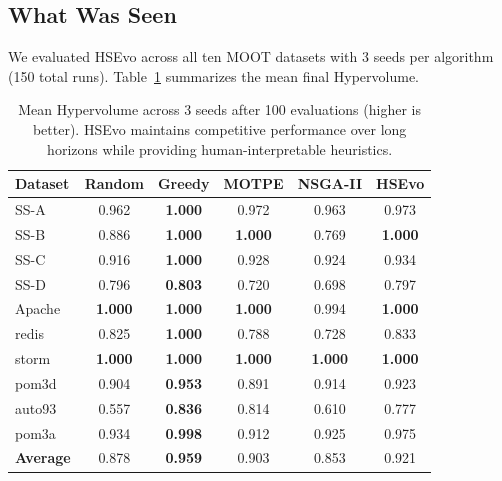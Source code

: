 \documentclass[sigconf,nonacm]{acmart}
\begin{document}
\subsection{What Was Seen}
We evaluated HSEvo across all ten MOOT datasets with 3 seeds per algorithm (150 total runs). Table~\ref{tab:moot-results} summarizes the mean final Hypervolume.

\begin{table}[h]
\caption{Mean Hypervolume across 3 seeds after 100 evaluations (higher is better). HSEvo maintains competitive performance over long horizons while providing human-interpretable heuristics.}
\label{tab:moot-results}
\begin{tabular}{lccccc}
\toprule
\textbf{Dataset} & \textbf{Random} & \textbf{Greedy} & \textbf{MOTPE} & \textbf{NSGA-II} & \textbf{HSEvo} \\
\midrule
SS-A    & 0.962 & \textbf{1.000} & 0.972 & 0.963 & 0.973 \\
SS-B    & 0.886 & \textbf{1.000} & \textbf{1.000} & 0.769 & \textbf{1.000} \\
SS-C    & 0.916 & \textbf{1.000} & 0.928 & 0.924 & 0.934 \\
SS-D    & 0.796 & \textbf{0.803} & 0.720 & 0.698 & 0.797 \\
Apache  & \textbf{1.000} & \textbf{1.000} & \textbf{1.000} & 0.994 & \textbf{1.000} \\
redis   & 0.825 & \textbf{1.000} & 0.788 & 0.728 & 0.833 \\
storm   & \textbf{1.000} & \textbf{1.000} & \textbf{1.000} & \textbf{1.000} & \textbf{1.000} \\
pom3d   & 0.904 & \textbf{0.953} & 0.891 & 0.914 & 0.923 \\
auto93  & 0.557 & \textbf{0.836} & 0.814 & 0.610 & 0.777 \\
pom3a   & 0.934 & \textbf{0.998} & 0.912 & 0.925 & 0.975 \\
\midrule
\textbf{Average} & 0.878 & \textbf{0.959} & 0.903 & 0.853 & 0.921 \\
\bottomrule
\end{tabular}
\end{table}
\end{document}
